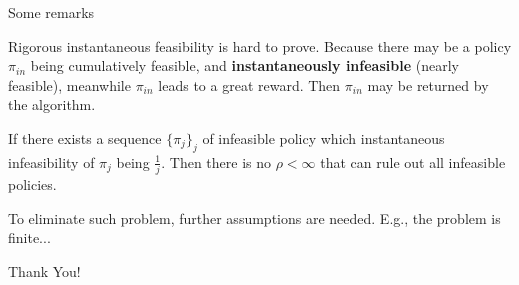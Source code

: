 \documentclass[aspectratio=43, 10pt]{beamer}
\begin{document}
    \begin{frame}{Some remarks}

        \vspace{-2cm}
        
        Rigorous instantaneous feasibility is hard to prove. Because there may be a policy $\pi_{in}$ being cumulatively feasible, and \textbf{instantaneously infeasible} (nearly feasible), meanwhile $\pi_{in}$ leads to a great reward. Then $\pi_{in}$ may be returned by the algorithm. 

        \vspace{0.3cm}
        If there exists a sequence $\{\pi_j\}_j$ of infeasible policy which instantaneous infeasibility of $\pi_j$ being $\frac{1}{j}$. Then there is no $\rho<\infty$ that can rule out all infeasible policies.

        \vspace{0.3cm}
        To eliminate such problem, further assumptions are needed. E.g., the problem is finite...
    \end{frame}


\begin{frame}
  \begin{center}
  {\fontsize{40}{50}\selectfont Thank You!}
  \end{center}
\end{frame}




\end{document}
